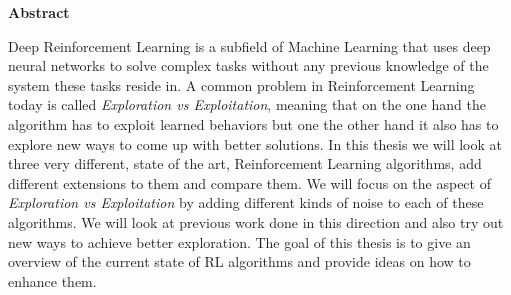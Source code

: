 \clearemptydoublepage
{}
{}





\vspace*{2cm}
\begin{center}
{\Large \bf Abstract}
\end{center}
\vspace{1cm}

Deep Reinforcement Learning is a subfield of Machine Learning that uses deep neural networks to solve complex tasks without any previous knowledge of the system these tasks reside in.
A common problem in Reinforcement Learning today is called \emph{Exploration vs Exploitation}, meaning that on the one hand the algorithm has to exploit learned behaviors but one the other hand it also has to explore new ways to come up with better solutions.
In this thesis we will look at three very different, state of the art, Reinforcement Learning algorithms, add different extensions to them and compare them.
We will focus on the aspect of \emph{Exploration vs Exploitation} by adding different kinds of noise to each of these algorithms.
We will look at previous work done in this direction and also try out new ways to achieve better exploration.
The goal of this thesis is to give an overview of the current state of RL algorithms and provide ideas on how to enhance them.
